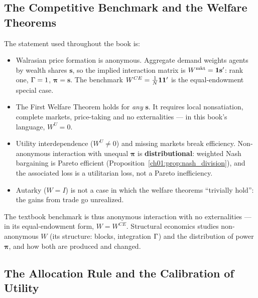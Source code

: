 \documentclass[../structural_economics_book.tex]{subfiles}
\begin{document}
\subsection{The Competitive Benchmark and the Welfare Theorems}

The statement used throughout the book is:
\begin{itemize}
\item Walrasian price formation is anonymous. Aggregate demand weights agents by wealth shares $\mathbf{s}$, so the implied interaction matrix is $W^{\text{mkt}} = \mathbf{1}\mathbf{s}'$: rank one, $\Gamma = 1$, $\boldsymbol{\pi} = \mathbf{s}$. The benchmark $W^{CE} = \frac{1}{N}\mathbf{1}\mathbf{1}'$ is the equal-endowment special case.
\item The First Welfare Theorem holds for \textit{any} $\mathbf{s}$. It requires local nonsatiation, complete markets, price-taking and no externalities --- in this book's language, $W^U = 0$.
\item Utility interdependence ($W^U \neq 0$) and missing markets break efficiency. Non-anonymous interaction with unequal $\boldsymbol{\pi}$ is \textbf{distributional}: weighted Nash bargaining is Pareto efficient (Proposition~\ref{ch01:prop:nash_division}), and the associated loss is a utilitarian loss, not a Pareto inefficiency.
\item Autarky ($W = I$) is not a case in which the welfare theorems ``trivially hold'': the gains from trade go unrealized.
\end{itemize}
The textbook benchmark is thus anonymous interaction with no externalities --- in its equal-endowment form, $W = W^{CE}$. Structural economics studies non-anonymous $W$ (its structure: blocks, integration $\Gamma$) and the distribution of power $\boldsymbol{\pi}$, and how both are produced and changed.

\subsection{The Allocation Rule and the Calibration of Utility}
\end{document}
